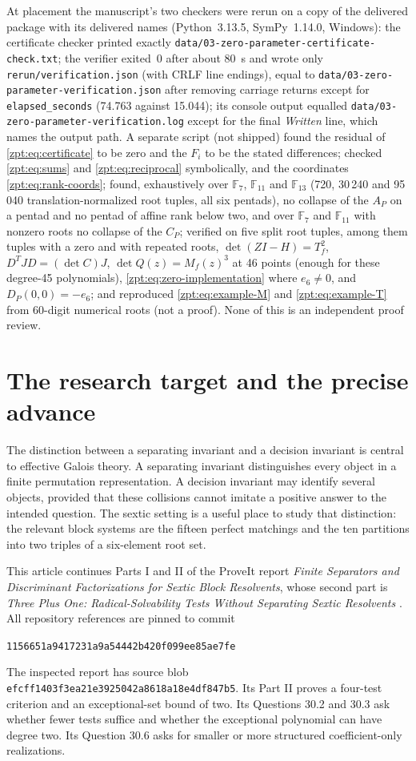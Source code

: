 \documentclass[11pt,letterpaper]{article}
\numberwithin{equation}{section}
\theoremstyle{definition}
\theoremstyle{remark}
\newcommand{\src}[1]{\texttt{\nolinkurl{#1}}}
\newcommand{\zptpin}{\texttt{1156651a9417231a9a54442b420f099ee85ae7fe}}
\newcommand{\code}[1]{\texttt{\small #1}}
\begin{document}
At placement the manuscript's two checkers were rerun on a copy of the
delivered package with its delivered names (Python~3.13.5, SymPy~1.14.0,
Windows): the certificate checker printed exactly
\src{data/03-zero-parameter-certificate-check.txt}; the verifier exited~0
after about 80~s and wrote only \src{rerun/verification.json} (with CRLF
line endings), equal to \src{data/03-zero-parameter-verification.json}
after removing carriage returns except for \src{elapsed_seconds} (74.763
against 15.044); its console output equalled
\src{data/03-zero-parameter-verification.log} except for the final
\emph{Written} line, which names the output path. A separate script (not
shipped) found the residual of \eqref{zpt:eq:certificate} to be zero and the
$F_i$ to be the stated differences; checked \eqref{zpt:eq:sums} and
\eqref{zpt:eq:reciprocal} symbolically, and the coordinates
\eqref{zpt:eq:rank-coords}; found, exhaustively over $\mathbb F_7$,
$\mathbb F_{11}$ and $\mathbb F_{13}$ (720, 30\,240 and 95\,040
translation-normalized root tuples, all six pentads), no collapse of the
$A_P$ on a pentad and no pentad of affine rank below two, and over
$\mathbb F_7$ and $\mathbb F_{11}$ with nonzero roots no collapse of the
$C_P$; verified on five split root tuples, among them tuples with a zero and
with repeated roots, $\det(ZI-H)=T_f^2$, $D^TJD=(\det C)J$, $\det
Q(z)=M_f(z)^3$ at 46 points (enough for these degree-45 polynomials),
\eqref{zpt:eq:zero-implementation} where $e_6\ne0$, and $D_P(0,0)=-e_6$;
and reproduced \eqref{zpt:eq:example-M} and \eqref{zpt:eq:example-T} from
60-digit numerical roots (not a proof). None of this is an independent
proof review.

\section{The research target and the precise advance}
\label{zpt:sec:target}
The distinction between a separating invariant and a decision invariant is
central to effective Galois theory. A separating invariant distinguishes
every object in a finite permutation representation. A decision invariant
may identify several objects, provided that these collisions cannot imitate
a positive answer to the intended question. The sextic setting is a useful
place to study that distinction: the relevant block systems are the fifteen
perfect matchings and the ten partitions into two triples of a six-element
root set.

This article continues Parts I and II of the ProveIt report
\emph{Finite Separators and Discriminant Factorizations for Sextic Block
Resolvents}, whose second part is \emph{Three Plus One: Radical-Solvability
Tests Without Separating Sextic Resolvents} \cite{zpt:repo-report}.
All repository references are pinned to commit
\begin{center}\small\texttt{\zptpin}\end{center}
The inspected report has source blob
\code{efcff1403f3ea21e3925042a8618a18e4df847b5}.
Its Part II proves a four-test criterion and an exceptional-set bound of
two. Its Questions 30.2 and 30.3 ask whether fewer tests suffice and whether
the exceptional polynomial can have degree two. Its Question 30.6 asks
for smaller or more structured coefficient-only realizations.
\end{document}
